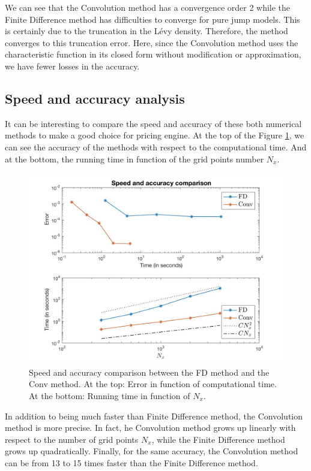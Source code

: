 We can see that the Convolution method has a convergence order 2 while the Finite Difference method has difficulties to converge for pure jump models. This is certainly due to the truncation in the L\'evy density. Therefore, the method converges to this truncation error. Here, since the Convolution method uses the characteristic function in its closed form without modification or approximation, we have fewer losses in the accuracy.

\subsection{Speed and accuracy analysis}
It can be interesting to compare the speed and accuracy of these both numerical methods to make a good choice for pricing engine. At the top of the Figure \ref{fig:speed}, we can see the accuracy of the methods with respect to the computational time. And at the bottom, the running time in function of the grid points number $N_x$.

\begin{figure}[!htb]
\centering
	\includegraphics[width=\textwidth]{gfx/speed}
	\caption{Speed and accuracy comparison between the FD method and the Conv method. At the top: Error in function of computational time. At the bottom: Running time in function of $N_x$.}
	\label{fig:speed}
\end{figure}

In addition to being much faster than Finite Difference method, the Convolution method is more precise. In fact, he Convolution method grows up linearly with respect to the number of grid points $N_x$, while the Finite Difference method grows up quadratically. Finally, for the same accuracy, the Convolution method can be from 13 to 15 times faster than the Finite Difference method.


